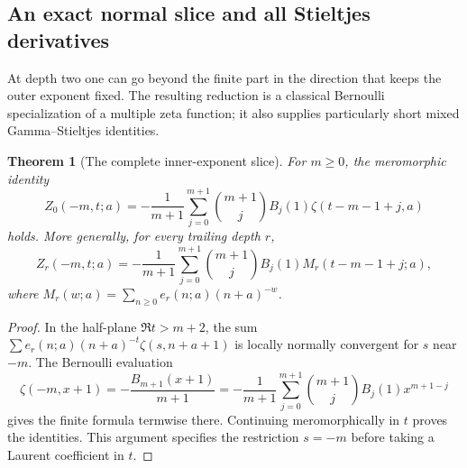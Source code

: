 \documentclass[11pt,a4paper]{article}
\newtheorem{theorem}{Theorem}[section]
\theoremstyle{definition}
\theoremstyle{remark}
\numberwithin{equation}{section}
\begin{document}
\subsection{An exact normal slice and all Stieltjes derivatives}

At depth two one can go beyond the finite part in the direction that
keeps the outer exponent fixed. The resulting reduction is a classical
Bernoulli specialization of a multiple zeta function; it also supplies
particularly short mixed Gamma--Stieltjes identities.

\begin{theorem}[The complete inner-exponent slice]
\label{h2:thm:slice}
For $m\ge0$, the meromorphic identity
\begin{equation}\label{h2:eq:slice}
 Z_0(-m,t;a)=-\frac1{m+1}\sum_{j=0}^{m+1}
       \binom{m+1}{j}B_j(1)\zeta(t-m-1+j,a)
\end{equation}
holds. More generally, for every trailing depth $r$,
\begin{equation}\label{h2:eq:slicedepth}
 Z_r(-m,t;a)=-\frac1{m+1}\sum_{j=0}^{m+1}
       \binom{m+1}{j}B_j(1)M_r(t-m-1+j;a),
\end{equation}
where $M_r(w;a)=\sum_{n\ge0}e_r(n;a)(n+a)^{-w}$.
\end{theorem}
\begin{proof}
In the half-plane $\Re t>m+2$, the sum
$\sum e_r(n;a)(n+a)^{-t}\zeta(s,n+a+1)$ is locally normally
convergent for $s$ near $-m$. The Bernoulli evaluation
\[
 \zeta(-m,x+1)=-\frac{B_{m+1}(x+1)}{m+1}
 =-\frac1{m+1}\sum_{j=0}^{m+1}
       \binom{m+1}{j}B_j(1)x^{m+1-j}
\]
gives the finite formula termwise there. Continuing meromorphically in
$t$ proves the identities. This argument specifies the restriction
$s=-m$ before taking a Laurent coefficient in $t$.
\end{proof}
\end{document}
